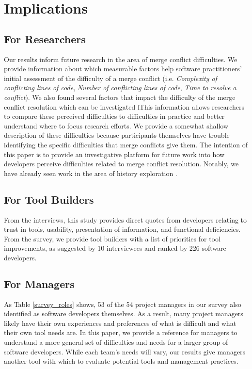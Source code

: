\section{Implications}\label{implications}
\subsection{For Researchers}
Our results inform future research in the area of merge conflict difficulties.
We provide information about which measurable factors help software practitioners' initial assessment of the difficulty of a merge conflict (i.e. \textit{Complexity of conflicting lines of code}, \textit{Number of conflicting lines of code}, \textit{Time to resolve a conflict}). We also found several factors that impact the difficulty of the merge conflict resolution which can be investigated lThis information allows researchers to compare these perceived difficulties to difficulties in practice and better understand where to focus research efforts. We provide a somewhat shallow description of these difficulties because participants themselves have trouble identifying the specific difficulties that merge conflicts give them. 
The intention of this paper is to provide an investigative platform for future work into how developers perceive difficulties related to merge conflict resolution. Notably, we have already seen work in the area of history exploration \cite{mihai_lenses}.
\subsection{For Tool Builders}
From the interviews, this study provides direct quotes from developers relating to trust in tools, usability, presentation of information, and functional deficiencies. From the survey, we provide tool builders with a list of priorities for tool improvements, as suggested by 10 interviewees and ranked by 226 software developers. 
\subsection{For Managers}
As Table \ref{survey_roles} shows, 53 of the 54 project managers in our survey also identified as software developers themselves. As a result, many project managers likely have their own experiences and preferences of what is difficult and what their own tool needs are. In this paper, we provide a reference for managers to understand a more general set of difficulties and needs for a larger group of software developers. While each team's needs will vary, our results give managers another tool with which to evaluate potential tools and management practices.